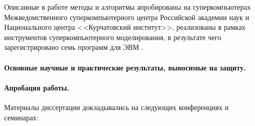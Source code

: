 \documentclass[a4paper,14pt]{extarticle}                     %
\numberwithin{equation}{section}                             %
\numberwithin{figure}{section}                               %
\numberwithin{table}{section}                                %
\theoremstyle{plain}                                         %
\numberwithin{theorem}{section}                              %
\numberwithin{lemma}{section}                                %
\numberwithin{definition}{section}                           %
\begin{document}
Описанные в работе методы и алгоритмы апробированы на суперкомпьютерах Межведомственного суперкомпьютерного центра Российской академии наук и Национального центра <<Курчатовский институт>>, реализованы в рамках инструментов суперкомпьютерного моделирования, в результате чего зарегистрировано семь программ для ЭВМ \cite{CertRybakov2019AVX,CertRybakov2020PrepStruct,CertGoryachev2020Crys,CertRybakov2021PrepUnstruct,CertRybakov2023Mon,CertGoryachev2023Crys,CertRybakov2024Surf}.

\paragraph{Основные научные и практические результаты, выносимые на защиту.}

\paragraph{Апробация работы.}

Материалы диссертации докладывались на следующих конференциях и семинарах:
\end{document}

